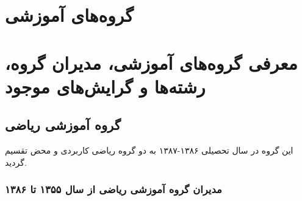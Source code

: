 \documentclass[
  letterpaper,
  DIV=11,
  numbers=noendperiod]{scrreprt}
\begin{document}

\chapter{گروه‌های
آموزشی}\label{ux6afux631ux648ux647ux647ux627ux6cc-ux622ux645ux648ux632ux634ux6cc}


\chapter{معرفی گروه‌های آموزشی، مدیران گروه، رشته‌ها و گرایش‌های
موجود}\label{ux645ux639ux631ux641ux6cc-ux6afux631ux648ux647ux647ux627ux6cc-ux622ux645ux648ux632ux634ux6cc-ux645ux62fux6ccux631ux627ux646-ux6afux631ux648ux647-ux631ux634ux62aux647ux647ux627-ux648-ux6afux631ux627ux6ccux634ux647ux627ux6cc-ux645ux648ux62cux648ux62f}

\section{گروه آموزشی
ریاضی}\label{ux6afux631ux648ux647-ux622ux645ux648ux632ux634ux6cc-ux631ux6ccux627ux636ux6cc}

این گروه در سال تحصیلی ۱۳۸۶-۱۳۸۷ به دو گروه ریاضی کاربردی و محض تقسیم
گردید.

\subsection{مدیران گروه آموزشی ریاضی از سال ۱۳۵۵ تا
۱۳۸۶}\label{ux645ux62fux6ccux631ux627ux646-ux6afux631ux648ux647-ux622ux645ux648ux632ux634ux6cc-ux631ux6ccux627ux636ux6cc-ux627ux632-ux633ux627ux644-ux6f1ux6f3ux6f5ux6f5-ux62aux627-ux6f1ux6f3ux6f8ux6f6}
\end{document}
